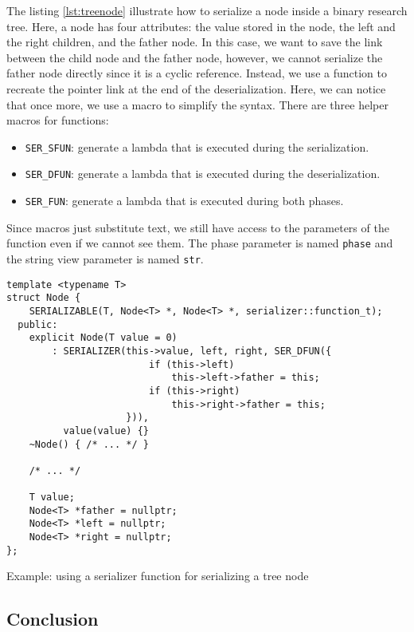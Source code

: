The listing \ref{lst:treenode} illustrate how to serialize a node inside a
binary research tree. Here, a node has four attributes: the value stored in the
node, the left and the right children, and the father node. In this case, we
want to save the link between the child node and the father node, however, we
cannot serialize the father node directly since it is a cyclic reference.
Instead, we use a function to recreate the pointer link at the end of the
deserialization. Here, we can notice that once more, we use a macro to simplify
the syntax. There are three helper macros for functions:

\begin{itemize}
  \item \texttt{SER\_SFUN}: generate a lambda that is executed during the
    serialization.
  \item \texttt{SER\_DFUN}: generate a lambda that is executed during the
    deserialization.
  \item \texttt{SER\_FUN}: generate a lambda that is executed during both
    phases.
\end{itemize}

Since macros just substitute text, we still have access to the parameters of the
function even if we cannot see them. The phase parameter is named \texttt{phase}
and the string view parameter is named \texttt{str}.

\begin{listing}[ht!]
\begin{verbatim}
template <typename T>
struct Node {
    SERIALIZABLE(T, Node<T> *, Node<T> *, serializer::function_t);
  public:
    explicit Node(T value = 0)
        : SERIALIZER(this->value, left, right, SER_DFUN({
                         if (this->left)
                             this->left->father = this;
                         if (this->right)
                             this->right->father = this;
                     })),
          value(value) {}
    ~Node() { /* ... */ }

    /* ... */

    T value;
    Node<T> *father = nullptr;
    Node<T> *left = nullptr;
    Node<T> *right = nullptr;
};
\end{verbatim}
\caption{Example: using a serializer function for serializing a tree node}
\label{lst:treenode}
\end{listing}

\subsection{Conclusion}
